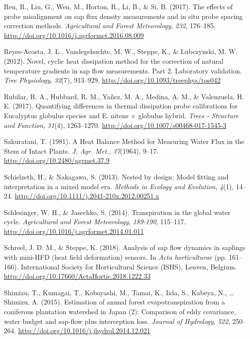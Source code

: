 \documentclass[11pt,twoside]{reedthesis}
\begin{document}
\hypertarget{ref-Ren2017}{}
Ren, R., Liu, G., Wen, M., Horton, R., Li, B., \& Si, B. (2017). The
effects of probe misalignment on sap flux density measurements and in
situ probe spacing correction methods. \emph{Agricultural and Forest
Meteorology}, \emph{232}, 176--185.
\url{http://doi.org/10.1016/j.agrformet.2016.08.009}

\hypertarget{ref-Reyes-Acosta2012}{}
Reyes-Acosta, J. L., Vandegehuchte, M. W., Steppe, K., \& Lubczynski, M.
W. (2012). Novel, cyclic heat dissipation method for the correction of
natural temperature gradients in sap flow measurements. Part 2.
Laboratory validation. \emph{Tree Physiology}, \emph{32}(7), 913--929.
\url{http://doi.org/10.1093/treephys/tps042}

\hypertarget{ref-Rubilar2017}{}
Rubilar, R. A., Hubbard, R. M., Yañez, M. A., Medina, A. M., \&
Valenzuela, H. E. (2017). Quantifying differences in thermal dissipation
probe calibrations for Eucalyptus globulus species and E. nitens ×
globulus hybrid. \emph{Trees - Structure and Function}, \emph{31}(4),
1263--1270. \url{http://doi.org/10.1007/s00468-017-1545-3}

\hypertarget{ref-Sakuratani1981}{}
Sakuratani, T. (1981). A Heat Balance Method for Measuring Water Flux in
the Stem of Intact Plants. \emph{J. Agr. Met.}, \emph{37}(1964), 9--17.
\url{http://doi.org/10.2480/agrmet.37.9}

\hypertarget{ref-Schielzeth2013}{}
Schielzeth, H., \& Nakagawa, S. (2013). Nested by design: Model fitting
and interpretation in a mixed model era. \emph{Methods in Ecology and
Evolution}, \emph{4}(1), 14--24.
\url{http://doi.org/10.1111/j.2041-210x.2012.00251.x}

\hypertarget{ref-Schlesinger2014}{}
Schlesinger, W. H., \& Jasechko, S. (2014). Transpiration in the global
water cycle. \emph{Agricultural and Forest Meteorology}, \emph{189-190},
115--117. \url{http://doi.org/10.1016/j.agrformet.2014.01.011}

\hypertarget{ref-Schreel2018}{}
Schreel, J. D. M., \& Steppe, K. (2018). Analysis of sap flow dynamics
in saplings with mini-HFD (heat field deformation) sensors. In
\emph{Acta horticulturae} (pp. 161--166). International Society for
Horticultural Science (ISHS), Leuven, Belgium.
\url{http://doi.org/10.17660/ActaHortic.2018.1222.33}

\hypertarget{ref-Shimizu2015}{}
Shimizu, T., Kumagai, T., Kobayashi, M., Tamai, K., Iida, S., Kabeya,
N., \ldots{} Shimizu, A. (2015). Estimation of annual forest
evapotranspiration from a coniferous plantation watershed in Japan (2):
Comparison of eddy covariance, water budget and sap-flow plus
interception loss. \emph{Journal of Hydrology}, \emph{522}, 250--264.
\url{http://doi.org/10.1016/j.jhydrol.2014.12.021}
\end{document}
